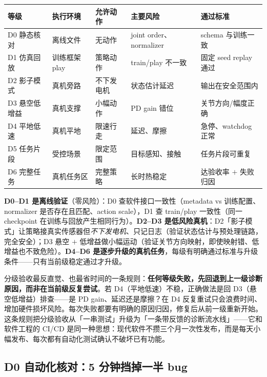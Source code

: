 \begin{center}
\small
\begin{tabular}{@{}llp{2.4cm}p{2.6cm}p{2.8cm}@{}}
\toprule
等级 & 执行环境 & 允许动作 & 主要风险 & 通过标准 \\
\midrule
D0 静态核对 & 离线文件 & 无动作 & joint order、normalizer & schema 与训练一致 \\
D1 仿真回放 & 训练框架 play & 策略动作 & train/play 不一致 & 固定 seed replay 通过 \\
D2 影子模式 & 真机旁路 & 不下发电机 & 状态估计延迟 & 输出在安全范围内 \\
D3 悬空低增益 & 真机支撑 & 小幅动作 & PD gain 错位 & 关节方向/幅度正确 \\
D4 平地低速 & 真机平地 & 限速行走 & 延迟、摩擦 & 急停、watchdog 正常 \\
D5 任务片段 & 受控场景 & 限定范围 & 目标感知、接触 & 任务片段可重复 \\
D6 完整任务 & 真机任务区 & 完整策略 & 长时热稳定 & 达验收率 $+$ 失败归因 \\
\bottomrule
\end{tabular}
\end{center}

\textbf{D0--D1 是离线验证}（零风险）：D0 查软件接口一致性（metadata vs 训练配置、normalizer 是否存在且匹配、action scale），D1 查 train/play 一致性（同一 checkpoint 在训练与回放产生相同行为）。\textbf{D2--D3 是低风险真机}：D2「影子模式」让策略接真实传感器但\emph{不下发电机}、只记日志（验证状态估计与预处理链路，完全安全）；D3 悬空 $+$ 低增益做小幅运动（验证关节方向映射，即使映射错、低增益也不致危险）。\textbf{D4--D6 是逐步升级的真机任务}，每级有明确通过标准与升级条件——只有当前级稳定通过才升级。

\begin{insight}\label{ins:rlmc-s2r-grading}
分级验收最反直觉、也最省时间的一条规则：\textbf{任何等级失败，先回退到上一级诊断原因，而非在当前级反复尝试}。若 D4（平地低速）不稳，正确做法是回 D3（悬空低增益）排查——是 PD gain、延迟还是摩擦？在 D4 反复重试只会浪费时间、增加硬件损坏风险。每次失败都要有明确的原因归因，修复后从前一级重新开始。这条规则把分级验收从「一串测试」升级为「一条带反馈的诊断流水线」——它和软件工程的 CI/CD 是同一种思想：现代软件不攒三个月一次性发布，而是每天小幅发布、每次都有自动化测试确认不破坏已有功能。
\end{insight}

\subsection{D0 自动化核对：5 分钟挡掉一半 bug}
\label{sec:rlmc-s2r-d0}

